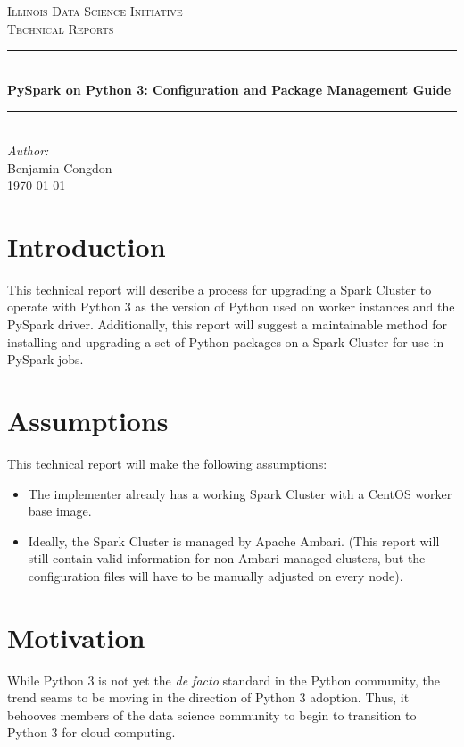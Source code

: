\documentclass[9pt,twocolumn,twoside]{idsi}
\author[1]{Benjamin Congdon}
\author[2]{Professor Robert J. Brunner}
\affil[1]{National Center For Supercomputing Applications (NCSA)}
\affil[2]{Laboratory for Computation, Data, and Machine Learning}
\title{\reporttitle}
\newcommand{\HRule}{\rule{\linewidth}{0.5mm}}
\def \reporttitle {PySpark on Python 3: Configuration and Package Management Guide}
\begin{document}
\begin{titlepage}
\center 
\textsc{\LARGE Illinois Data Science Initiative}\\[1.5cm] 
\textsc{\Large Technical Reports}\\[0.5cm] \HRule \\[0.4cm]
{\huge \bfseries \reporttitle } \\[0.4cm] \HRule \\[1.5cm]
\Large \emph{Author:}\\ Benjamin Congdon\\[3cm]
{\large \today}\\[3cm] %
\vfill
\end{titlepage}


\maketitle

\section{Introduction}
This technical report will describe a process for upgrading a Spark Cluster to operate with Python 3 as the version of Python used on worker instances and the PySpark driver. Additionally, this report will suggest a maintainable method for installing and upgrading a set of Python packages on a Spark Cluster for use in PySpark jobs.

\section{Assumptions}
This technical report will make the following assumptions:
\begin{itemize}
  \item The implementer already has a working Spark Cluster with a CentOS worker base image.
  \item Ideally, the Spark Cluster is managed by Apache Ambari. (This report will still contain valid information for non-Ambari-managed clusters, but the configuration files will have to be manually adjusted on every node).
\end{itemize}

\section{Motivation}
While Python 3 is not yet the \emph{de facto} standard in the Python community, the trend seams to be moving in the direction of Python 3 adoption. Thus, it behooves members of the data science community to begin to transition to Python 3 for cloud computing.
\end{document}
